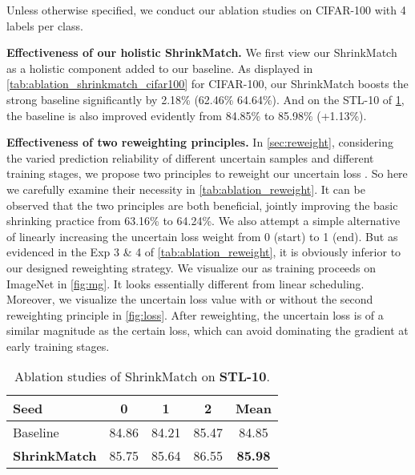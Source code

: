 \documentclass[10pt,twocolumn,letterpaper]{article}
\begin{document}
Unless otherwise specified, we conduct our ablation studies on CIFAR-100 with 4 labels per class.

\vspace{1mm}
\noindent
\textbf{Effectiveness of our holistic ShrinkMatch.} We first view our ShrinkMatch as a holistic component added to our baseline. As displayed in \cref{tab:ablation_shrinkmatch_cifar100} for CIFAR-100, our ShrinkMatch boosts the strong baseline significantly by 2.18\% (62.46\%  64.64\%). And on the STL-10 of \cref{tab:ablation_shrinkmatch_stl10}, the baseline is also improved evidently from 84.85\% to 85.98\% (+1.13\%).

\vspace{1mm}
\noindent
\textbf{Effectiveness of two reweighting principles.} In \cref{sec:reweight}, considering the varied prediction reliability of different uncertain samples and different training stages, we propose two principles to reweight our uncertain loss . So here we carefully examine their necessity in \cref{tab:ablation_reweight}. It can be observed that the two principles are both beneficial, jointly improving the basic shrinking practice from 63.16\% to 64.24\%. We also attempt a simple alternative of linearly increasing the uncertain loss weight from 0 (start) to 1 (end). But as evidenced in the Exp 3 \& 4 of \cref{tab:ablation_reweight}, it is obviously inferior to our designed reweighting strategy. We visualize our  as training proceeds on ImageNet in \cref{fig:mg}. It looks essentially different from linear scheduling.  Moreover, we visualize the uncertain loss value with or without the second reweighting principle in \cref{fig:loss}. After reweighting, the uncertain loss is of a similar magnitude as the certain loss, which can avoid dominating the gradient at early training stages.

\begin{table}[t]
\small
\centering
\setlength\tabcolsep{3mm}
    \begin{tabular}{l|ccc|c}
    \toprule
    
    Seed & 0 & 1 & 2 & Mean \\
    
    \midrule
    
    Baseline & 84.86 & 84.21 & 85.47 & 84.85 \\
    
    \textbf{ShrinkMatch} & 85.75 & 85.64 & 86.55 & \textbf{85.98} \\
    
    \bottomrule

    \end{tabular}
    \vspace{-1mm}
    \caption{Ablation studies of ShrinkMatch on \textbf{STL-10}.}
    \vspace{-2mm}
    \label{tab:ablation_shrinkmatch_stl10}
\end{table}
 
\end{document}
